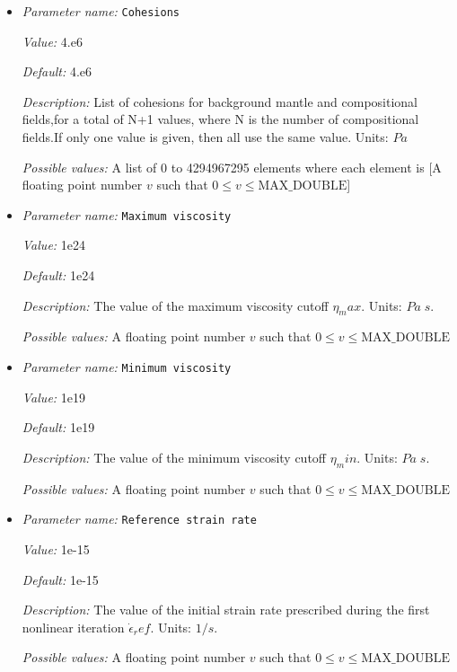 \begin{itemize}
{\it Possible values:} A list of 0 to 4294967295 elements where each element is [A floating point number $v$ such that $0 \leq v \leq \text{MAX\_DOUBLE}$]
\item {\it Parameter name:} {\tt Cohesions}
\label{parameters:Material model/Dynamic Friction/Viscosities/Cohesions}


{\it Value:} 4.e6


{\it Default:} 4.e6


{\it Description:} List of cohesions for background mantle and compositional fields,for a total of N+1 values, where N is the number of compositional fields.If only one value is given, then all use the same value. Units: $Pa$


{\it Possible values:} A list of 0 to 4294967295 elements where each element is [A floating point number $v$ such that $0 \leq v \leq \text{MAX\_DOUBLE}$]
\item {\it Parameter name:} {\tt Maximum viscosity}
\label{parameters:Material model/Dynamic Friction/Viscosities/Maximum viscosity}


{\it Value:} 1e24


{\it Default:} 1e24


{\it Description:} The value of the maximum viscosity cutoff $\eta_max$. Units: $Pa\;s$.


{\it Possible values:} A floating point number $v$ such that $0 \leq v \leq \text{MAX\_DOUBLE}$
\item {\it Parameter name:} {\tt Minimum viscosity}
\label{parameters:Material model/Dynamic Friction/Viscosities/Minimum viscosity}


{\it Value:} 1e19


{\it Default:} 1e19


{\it Description:} The value of the minimum viscosity cutoff $\eta_min$. Units: $Pa\;s$.


{\it Possible values:} A floating point number $v$ such that $0 \leq v \leq \text{MAX\_DOUBLE}$
\item {\it Parameter name:} {\tt Reference strain rate}
\label{parameters:Material model/Dynamic Friction/Viscosities/Reference strain rate}


{\it Value:} 1e-15


{\it Default:} 1e-15


{\it Description:} The value of the initial strain rate prescribed during the first nonlinear iteration $\dot{\epsilon}_ref$. Units: $1/s$.


{\it Possible values:} A floating point number $v$ such that $0 \leq v \leq \text{MAX\_DOUBLE}$
\end{itemize}

